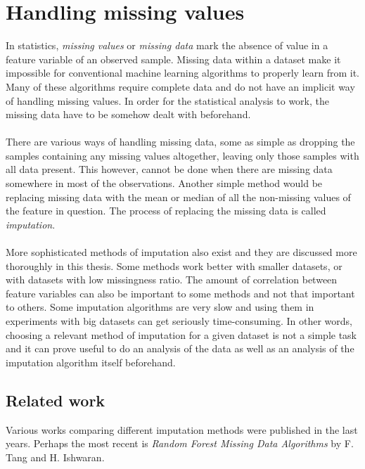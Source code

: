 \documentclass[11pt]{article}
\begin{document}
  \section{Handling missing values}
    In statistics, {\it missing values} or {\it missing data} mark the absence of value in a feature variable of an observed sample. Missing data within a dataset make it impossible for conventional machine learning algorithms to properly learn from it. Many of these algorithms require complete data and do not have an implicit way of handling missing values. In order for the statistical analysis to work, the missing data have to be somehow dealt with beforehand.\cite{otfi}
    \\~\\
    There are various ways of handling missing data, some as simple as dropping the samples containing any missing values altogether, leaving only those samples with all data present.\cite{lwd} This however, cannot be done when there are missing data somewhere in most of the observations. Another simple method would be replacing missing data with the mean or median of all the non-missing values of the feature in question. The process of replacing the missing data is called {\it imputation}.
    \\~\\
    More sophisticated methods of imputation also exist and they are discussed more thoroughly in this thesis. Some methods work better with smaller datasets, or with datasets with low missingness ratio. The amount of correlation between feature variables can also be important to some methods and not that important to others.\cite{otfi} Some imputation algorithms are very slow and using them in experiments with big datasets can get seriously time-consuming. In other words, choosing a relevant method of imputation for a given dataset is not a simple task and it can prove useful to do an analysis of the data as well as an analysis of the imputation algorithm itself beforehand.
    \subsection{Related work}
      Various works comparing different imputation methods were published in the last years. Perhaps the most recent is {\it Random Forest Missing Data Algorithms} by F. Tang and H. Ishwaran.\cite{otfi}
\end{document}
